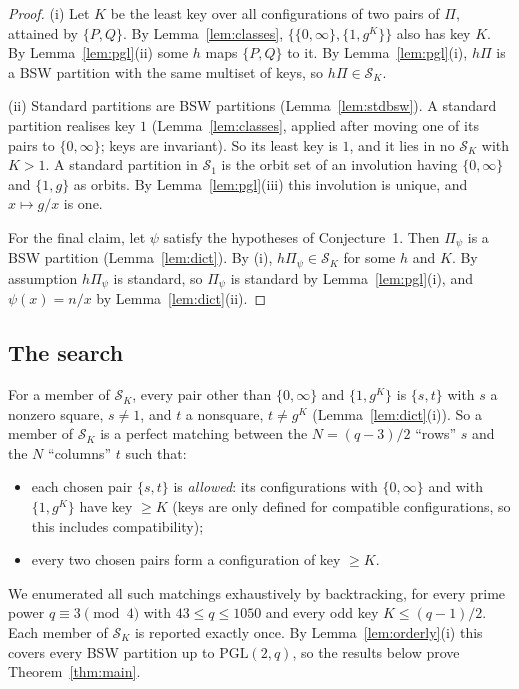 \documentclass[11pt,a4paper]{article}
\theoremstyle{definition}
\theoremstyle{remark}
\newcommand{\PGL}{\mathrm{PGL}}
\begin{document}
\begin{proof}
(i) Let $K$ be the least key over all configurations of two pairs of $\Pi$, attained by $\{P,Q\}$. By
Lemma~\ref{lem:classes}, $\{\{0,\infty\},\{1,g^K\}\}$ also has key $K$. By Lemma~\ref{lem:pgl}(ii) some $h$ maps
$\{P,Q\}$ to it. By Lemma~\ref{lem:pgl}(i), $h\Pi$ is a BSW partition with the same multiset of keys, so
$h\Pi\in\mathcal S_K$.

(ii) Standard partitions are BSW partitions (Lemma~\ref{lem:stdbsw}). A standard partition realises key $1$ (Lemma~\ref{lem:classes}, applied after moving one of its pairs to
$\{0,\infty\}$; keys are invariant). So its least key is $1$, and it lies in no $\mathcal S_K$ with $K>1$. A
standard partition in $\mathcal S_1$ is the orbit set of an involution having $\{0,\infty\}$ and $\{1,g\}$ as
orbits. By Lemma~\ref{lem:pgl}(iii) this involution is unique, and $x\mapsto g/x$ is one.

For the final claim, let $\psi$ satisfy the hypotheses of Conjecture~1. Then $\Pi_\psi$ is a BSW partition
(Lemma~\ref{lem:dict}). By (i), $h\Pi_\psi\in\mathcal S_K$ for some $h$ and $K$. By assumption $h\Pi_\psi$ is
standard, so $\Pi_\psi$ is standard by Lemma~\ref{lem:pgl}(i), and $\psi(x)=n/x$ by Lemma~\ref{lem:dict}(ii).
\end{proof}

\subsection{The search}

For a member of $\mathcal S_K$, every pair other than $\{0,\infty\}$ and $\{1,g^K\}$ is $\{s,t\}$ with $s$ a
nonzero square, $s\ne1$, and $t$ a nonsquare, $t\ne g^K$ (Lemma~\ref{lem:dict}(i)). So a member of
$\mathcal S_K$ is a perfect matching between the $N=(q-3)/2$ ``rows'' $s$ and the $N$ ``columns'' $t$ such that:
\begin{itemize}
\item each chosen pair $\{s,t\}$ is \emph{allowed}: its configurations with $\{0,\infty\}$ and with
$\{1,g^K\}$ have key $\ge K$ (keys are only defined for compatible configurations, so this includes
compatibility);
\item every two chosen pairs form a configuration of key $\ge K$.
\end{itemize}
We enumerated all such matchings exhaustively by backtracking, for every prime power $q\equiv3\pmod4$ with
$43\le q\le1050$ and every odd key $K\le(q-1)/2$. Each member of $\mathcal S_K$ is reported exactly once. By
Lemma~\ref{lem:orderly}(i) this covers every BSW partition up to $\PGL(2,q)$, so the results below prove
Theorem~\ref{thm:main}.
\end{document}
